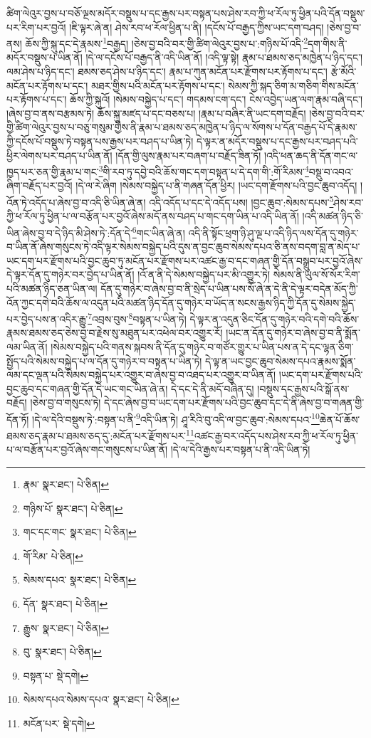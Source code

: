 ཚིག་ལེའུར་བྱས་པ་བཅོ་ལྔས་མདོར་བསྡུས་པ་དང་རྒྱས་པར་བསྟན་པས་ཤེས་རབ་ཀྱི་ཕ་རོལ་ཏུ་ཕྱིན་པའི་དོན་བསྡུས་པར་རིག་པར་བྱའོ། །ཇི་ལྟར་ཞེ་ན། ཤེས་རབ་ཕ་རོལ་ཕྱིན་པ་ནི། །དངོས་པོ་བརྒྱད་ཀྱིས་ཡང་དག་བཤད། །ཅེས་བྱ་བ་ནས། ཆོས་ཀྱི་སྐུ་དང་དེ་རྣམས་\footnote{རྣམ་  སྣར་ཐང་།  པེ་ཅིན། }བརྒྱད། །ཅེས་བྱ་བའི་བར་གྱི་ཚིག་ལེའུར་བྱས་པ་:གཉིས་པོ་འདི་\footnote{གཉིས་པོ་  སྣར་ཐང་།  པེ་ཅིན། }དག་གིས་ནི་མདོར་བསྡུས་པ་ཡིན་ནོ། །དེ་ལ་དངོས་པོ་བརྒྱད་ནི་འདི་ཡིན་ནོ། །འདི་ལྟ་སྟེ། རྣམ་པ་ཐམས་ཅད་མཁྱེན་པ་ཉིད་དང་། ལམ་ཤེས་པ་ཉིད་དང་། ཐམས་ཅད་ཤེས་པ་ཉིད་དང་། རྣམ་པ་ཀུན་མངོན་པར་རྫོགས་པར་རྟོགས་པ་དང་། རྩེ་མོའི་མངོན་པར་རྟོགས་པ་དང་། མཐར་གྱིས་པའི་མངོན་པར་རྟོགས་པ་དང་། སེམས་ཀྱི་སྐད་ཅིག་མ་གཅིག་གིས་མངོན་པར་རྟོགས་པ་དང་། ཆོས་ཀྱི་སྐུའོ། །སེམས་བསྐྱེད་པ་དང་། གདམས་ངག་དང་། ངེས་འབྱེད་ཡན་ལག་རྣམ་བཞི་དང་། །ཞེས་བྱ་བ་ནས་བརྩམས་ཏེ། ཆོས་སྐུ་མཛད་པ་དང་བཅས་པ། །རྣམ་པ་བཞིར་ནི་ཡང་དག་བརྗོད། །ཅེས་བྱ་བའི་བར་གྱི་ཚིག་ལེའུར་བྱས་པ་བཅུ་གསུམ་གྱིས་ནི་རྣམ་པ་ཐམས་ཅད་མཁྱེན་པ་ཉིད་ལ་སོགས་པ་དོན་བརྒྱད་པོ་དེ་རྣམས་ཀྱི་དངོས་པོ་བསྡུས་ཏེ་བསྟན་པས་རྒྱས་པར་བཤད་པ་ཡིན་ཏེ། དེ་ལྟར་ན་མདོར་བསྡུས་པ་དང་རྒྱས་པར་བཤད་པའི་ཕྱིར་ལེགས་པར་བཤད་པ་ཡིན་ནོ། །དོན་གྱི་ལུས་རྣམ་པར་བཞག་པ་བརྗོད་ཟིན་ཏོ། །འདི་ཕན་ཆད་ནི་དོན་གང་ལ་ཁྱད་པར་ཅན་གྱི་རྣམ་པ་གང་\footnote{གང་དང་གང་  སྣར་ཐང་།  པེ་ཅིན། }གི་རབ་ཏུ་དབྱེ་བའི་ཆོས་གང་དག་བསྟན་པ་དེ་དག་གི་:གོ་རིམས་\footnote{གོ་རིམ་  པེ་ཅིན། }བསྡུ་བ་འབའ་ཞིག་བརྗོད་པར་བྱའོ། །དེ་ལ་རེ་ཞིག །སེམས་བསྐྱེད་པ་ནི་གཞན་དོན་ཕྱིར། །ཡང་དག་རྫོགས་པའི་བྱང་ཆུབ་འདོད། །འོན་ཏེ་འདོད་པ་ཞེས་བྱ་བ་འདི་ཅི་ཡིན་ཞེ་ན། འདི་འདོད་པ་དང་དེ་འདོད་པས། །བྱང་ཆུབ་:སེམས་དཔས་\footnote{སེམས་དཔའ་  སྣར་ཐང་།  པེ་ཅིན། }ཤེས་རབ་ཀྱི་ཕ་རོལ་ཏུ་ཕྱིན་པ་ལ་བརྩོན་པར་བྱའོ་ཞེས་མདོ་ནས་བཤད་པ་གང་དག་ཡིན་པ་འདི་ཡིན་ནོ། །འདི་མཚན་ཉིད་ཅི་ཡིན་ཞེས་བྱ་བ་དེ་ཉིད་མི་ཤེས་ཏེ་:དོན་དེ་\footnote{དོན་  སྣར་ཐང་།  པེ་ཅིན། }གང་ཡིན་ཞེ་ན། འདི་ནི་སྟོང་ཕྲག་ཉི་ཤུ་ལྔ་པ་འདི་ཉིད་ལས་དོན་དུ་གཉེར་བ་ཡིན་ནོ་ཞེས་གསུངས་ཏེ་འདི་ལྟར་སེམས་བསྐྱེད་པའི་དུས་ན་བྱང་ཆུབ་སེམས་དཔའ་ཅི་ནས་བདག་བླ་ན་མེད་པ་ཡང་དག་པར་རྫོགས་པའི་བྱང་ཆུབ་ཏུ་མངོན་པར་རྫོགས་པར་འཚང་རྒྱ་བ་དང་གཞན་གྱི་དོན་བསྒྲུབ་པར་བྱའོ་ཞེས་དེ་ལྟར་དོན་དུ་གཉེར་བར་བྱེད་པ་ཡིན་ནོ། །འོ་ན་ནི་དེ་སེམས་བསྐྱེད་པར་མི་འགྱུར་ཏེ། སེམས་ནི་ཡུལ་སོ་སོར་རིག་པའི་མཚན་ཉིད་ཅན་ཡིན་ལ། དོན་དུ་གཉེར་བ་ཞེས་བྱ་བ་ནི་སྲེད་པ་ཡིན་པས་སོ་ཞེ་ན་དེ་ནི་དེ་ལྟར་བདེན་མོད་ཀྱི་འོན་ཀྱང་དགེ་བའི་ཆོས་ལ་འདུན་པའི་མཚན་ཉིད་དོན་དུ་གཉེར་བ་ཡོད་ན་སངས་རྒྱས་ཉིད་ཀྱི་དོན་དུ་སེམས་སྐྱེད་པར་བྱེད་པས་ན་འདིར་རྒྱུ་\footnote{རྒྱུས་  སྣར་ཐང་།  པེ་ཅིན། }འབྲས་བུས་\footnote{བུ་  སྣར་ཐང་།  པེ་ཅིན། }བསྟན་པ་ཡིན་ཏེ། དེ་ལྟར་ན་འདུན་ཅིང་དོན་དུ་གཉེར་བའི་དགེ་བའི་ཆོས་རྣམས་ཐམས་ཅད་ཅེས་བྱ་བ་རྗེས་སུ་མཐུན་པར་འཕེལ་བར་འགྱུར་རོ། །ཡང་ན་དོན་དུ་གཉེར་བ་ཞེས་བྱ་བ་ནི་སྨོན་ལམ་ཡིན་ནོ། །སེམས་བསྐྱེད་པའི་གནས་སྐབས་ནི་དོན་དུ་གཉེར་བ་གཙོར་གྱུར་པ་ཡིན་པས་ན་དེ་དང་ལྷན་ཅིག་སྤྱོད་པའི་སེམས་བསྐྱེད་པ་ལ་དོན་དུ་གཉེར་བ་བསྟན་པ་ཡིན་ཏེ། དེ་ལྟ་ན་ཡང་བྱང་ཆུབ་སེམས་དཔའ་རྣམས་སྨོན་ལམ་དང་ལྡན་པའི་སེམས་བསྐྱེད་པར་འགྱུར་བ་ཞེས་བྱ་བ་འཐད་པར་འགྱུར་བ་ཡིན་ནོ། །ཡང་དག་པར་རྫོགས་པའི་བྱང་ཆུབ་དང་གཞན་གྱི་དོན་དེ་ཡང་གང་ཡིན་ཞེ་ན། དེ་དང་དེ་ནི་མདོ་བཞིན་དུ། །བསྡུས་དང་རྒྱས་པའི་སྒོ་ནས་བརྗོད། །ཅེས་བྱ་བ་གསུངས་ཏེ། དེ་དང་ཞེས་བྱ་བ་ཡང་དག་པར་རྫོགས་པའི་བྱང་ཆུབ་དང་དེ་ནི་ཞེས་བྱ་བ་གཞན་གྱི་དོན་ཏོ། །དེ་ལ་དེའི་བསྡུས་ཏེ་:བསྟན་པ་ནི་\footnote{བསྟན་པ་  སྡེ་དགེ། }འདི་ཡིན་ཏེ། ཤཱ་རིའི་བུ་འདི་ལ་བྱང་ཆུབ་:སེམས་དཔའ་\footnote{སེམས་དཔའ་སེམས་དཔའ་  སྣར་ཐང་།  པེ་ཅིན། }ཆེན་པོ་ཆོས་ཐམས་ཅད་རྣམ་པ་ཐམས་ཅད་དུ་:མངོན་པར་རྫོགས་པར་\footnote{མངོན་པར་  སྡེ་དགེ། }འཚང་རྒྱ་བར་འདོད་པས་ཤེས་རབ་ཀྱི་ཕ་རོལ་ཏུ་ཕྱིན་པ་ལ་བརྩོན་པར་བྱའོ་ཞེས་གང་གསུངས་པ་ཡིན་ནོ། །དེ་ལ་དེའི་རྒྱས་པར་བསྟན་པ་ནི་འདི་ཡིན་ཏེ། 